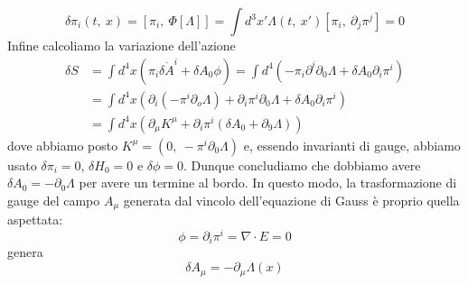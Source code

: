 \begin{equation*}
    \delta \pi_i(t, ~x) = [\pi_i, ~\Phi[\Lambda]] = \int d^3 x' \Lambda(t, ~x')[\pi_i, ~\partial_j \pi^j] = 0
\end{equation*}
    Infine calcoliamo la variazione dell'azione 
\begin{equation*}
\begin{aligned}
    \delta S & = \int d^4 x (\pi_i \delta \dot A^i + \delta A_0 \phi) = \int d^4 (-\pi_i\partial^i \partial_0 \Lambda + \delta A_0 \partial_i \pi^i ) \\ & = \int d^4 x (\partial_i (-\pi^i \partial_o \Lambda) + \partial_i \pi^i \partial_0 \Lambda + \delta A_0 \partial_i \pi^i ) \\ & = \int d^4 x (\partial_\mu K^\mu + \partial_i \pi^i (\delta A_0 + \partial_9 \Lambda))
\end{aligned}
\end{equation*}
    dove abbiamo posto $K^\mu = (0, ~- \pi^i \partial_0 \Lambda)$ e, essendo invarianti di gauge, abbiamo usato $\delta \pi_i = 0$, $\delta H_0 = 0$ e $\delta \phi = 0$. Dunque concludiamo che dobbiamo avere $\delta A_0 = - \partial_0 \Lambda$ per avere un termine al bordo. In questo modo, la trasformazione di gauge del campo $A_\mu$ generata dal vincolo dell'equazione di Gauss è proprio quella aspettata:
\begin{equation*}
    \phi = \partial_i \pi^i = \nabla \cdot E = 0
\end{equation*}
    genera 
\begin{equation*}
    \delta A_\mu = - \partial_\mu \Lambda(x)
\end{equation*}
